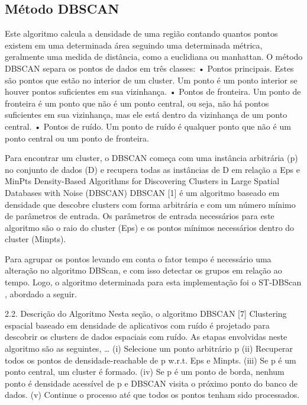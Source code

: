 \subsection{Método DBSCAN}

Este algoritmo calcula a densidade de uma região contando quantos pontos existem em uma determinada área seguindo uma determinada métrica, geralmente uma medida de distância, como a euclidiana ou manhattan. O método DBSCAN separa os pontos de dados em três classes:
• Pontos principais. Estes são pontos que estão no interior de um cluster. Um ponto é um ponto interior se houver pontos suficientes em sua vizinhança.
• Pontos de fronteira. Um ponto de fronteira é um ponto que não é um ponto central, ou seja, não há pontos suficientes em sua vizinhança, mas ele está dentro da vizinhança de um ponto central.
• Pontos de ruído. Um ponto de ruído é qualquer ponto que não é um ponto central ou um ponto de fronteira.

Para encontrar um cluster, o DBSCAN começa com uma instância arbitrária (p) no conjunto de dados (D) e recupera todas as instâncias de D em relação a Eps e MinPts
Density-Based Algorithms for Discovering Clusters in Large Spatial Databases with Noise (DBSCAN)
DBSCAN [1] é um algoritmo baseado em densidade que descobre clusters com forma arbitrária e com um número mínimo de parâmetros de entrada. Os parâmetros de entrada necessários para este algoritmo são o raio do cluster (Eps) e os pontos mínimos necessários dentro do cluster (Minpts).

Para agrupar os pontos levando em conta o fator tempo é necessário uma alteração no algoritmo DBScan, e com isso detectar os grupos em relação ao tempo. Logo, o algoritmo determinada para esta implementação foi o ST-DBScan \cite{Birant2007STDBSCANAA}, abordado a seguir.

2.2. Descrição do Algoritmo
Nesta seção, o algoritmo DBSCAN [7] Clustering espacial baseado em densidade de aplicativos com ruído é projetado para descobrir os clusters de dados espaciais com ruído. As etapas envolvidas neste algoritmo são as seguintes,
…
(i) Selecione um ponto arbitrário p
(ii) Recuperar todos os pontos de densidade-reachable de p w.r.t. Eps e Minpts.
(iii) Se p é um ponto central, um cluster é formado.
(iv) Se p é um ponto de borda, nenhum ponto é densidade acessível de p e DBSCAN visita o próximo ponto do banco de dados.
(v) Continue o processo até que todos os pontos tenham sido processados.

